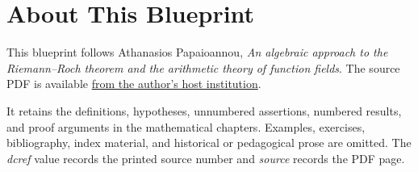 \chapter*{About This Blueprint}
This blueprint follows Athanasios Papaioannou, \emph{An algebraic approach to
the Riemann--Roch theorem and the arithmetic theory of function fields}.  The
source PDF is available
\href{http://www.fen.bilkent.edu.tr/~franz/mat/Riemann-Roch.pdf}{from the
author's host institution}.

It retains the definitions, hypotheses, unnumbered assertions, numbered
results, and proof arguments in the mathematical chapters.  Examples,
exercises, bibliography, index material, and historical or pedagogical prose
are omitted.  The \emph{dcref} value records the printed source number and
\emph{source} records the PDF page.





